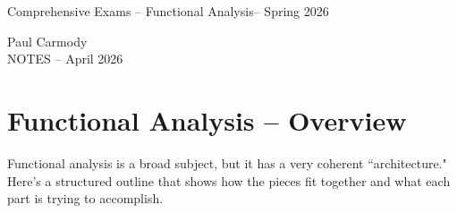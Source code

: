 \documentclass[12pt,a4paper]{report}
\newcommand{\CLASSNAME}{Comprehensive Exams -- Functional Analysis}
\newcommand{\STUDENTNAME}{Paul Carmody}
\newcommand{\ASSIGNMENT}{NOTES }
\newcommand{\DUEDATE}{April 2026}
\newcommand{\SEMESTER}{Spring 2026}
\begin{document}
\begin{center}
	\Large{\CLASSNAME -- \SEMESTER} 
\end{center}
\begin{center}
	\STUDENTNAME \\
	\ASSIGNMENT -- \DUEDATE\\
\end{center} 

\section*{Functional Analysis -- Overview}

Functional analysis is a broad subject, but it has a very coherent ``architecture." Here’s a structured outline that shows how the pieces fit together and what each part is trying to accomplish.
\end{document}
